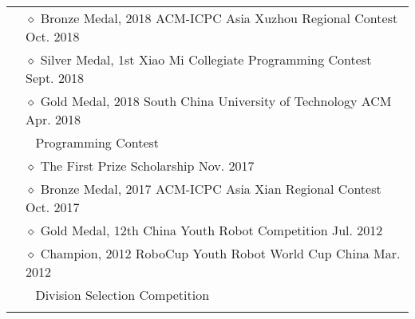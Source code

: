 \documentclass[letterpaper, 11pt]{article}
\begin{document}
\begin{longtable}{p{1.3in}p{4.8in}}
& $\diamond$ Bronze Medal, 2018 ACM-ICPC Asia Xuzhou Regional Contest \hfill Oct. 2018 \\

& $\diamond$ Silver Medal, 1st Xiao Mi Collegiate Programming Contest \hfill Sept. 2018 \\

& $\diamond$ Gold Medal, 2018 South China University of Technology ACM \hfill Apr. 2018 \\
& $\ \ $ Programming Contest \\

& $\diamond$ The First Prize Scholarship \hfill Nov. 2017 \\

& $\diamond$ Bronze Medal, 2017 ACM-ICPC Asia Xian Regional Contest \hfill Oct. 2017 \\

& $\diamond$ Gold Medal, 12th China Youth Robot Competition \hfill Jul. 2012 \\

& $\diamond$ Champion, 2012 RoboCup Youth Robot World Cup China \hfill Mar. 2012 \\
& $\ \ $ Division Selection Competition \\

& \\





\end{longtable}
\end{document}

